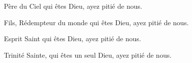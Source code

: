 Père du Ciel qui êtes Dieu, ayez pitié de nous.

Fils, Rédempteur du monde qui êtes Dieu, ayez pitié de nous.

Esprit Saint qui êtes Dieu, ayez pitié de nous.

Trinité Sainte, qui êtes un seul Dieu, ayez pitié de nous.


